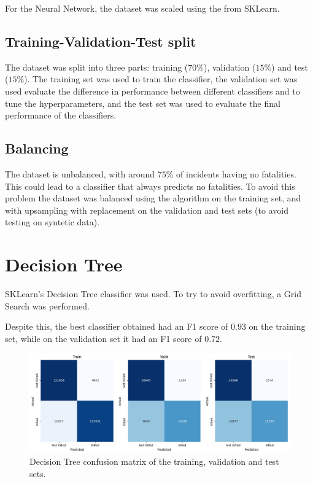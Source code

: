 For the Neural Network, the dataset was scaled using the  from SKLearn.

\subsection{Training-Validation-Test split}

The dataset was split into three parts: training ($70\%$), validation ($15\%$) and test ($15\%$). The training set was used to train the classifier, the validation set was used evaluate the difference in performance between different classifiers and to tune the hyperparameters, and the test set was used to evaluate the final performance of the classifiers.

\subsection{Balancing}

The dataset is unbalanced, with around $75\%$ of incidents having no fatalities. This could lead to a classifier that always predicts no fatalities. To avoid this problem the dataset was balanced using the \cite{chawla2002smote} algorithm on the training set, and with upsampling with replacement on the validation and test sets (to avoid testing on syntetic data).


\section{Decision Tree}

SKLearn's Decision Tree classifier was used. To try to avoid overfitting, a Grid Search was performed.

Despite this, the best classifier obtained had an F1 score of $0.93$ on the training set, while on the validation set it had an F1 score of $0.72$.

\begin{figure}[h]
    \centering
    \includegraphics[width=\textwidth]{images/Clustering/decision_tree_cm.png}
    \caption{Decision Tree confusion matrix of the training, validation and test sets.}
    \label{fig:decision_tree_cm}
\end{figure}

